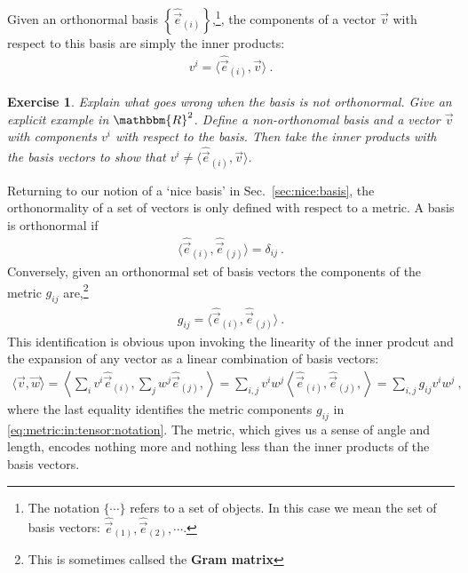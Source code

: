\documentclass[
  11pt,
	colorful,
	raggedright,
]{tufte-style-thesis-flip}
\newtheorem{exercise}{Exercise}[section]
\begin{document}
Given an orthonormal basis $\left\{\hat{\vec{e}}_{(i)}\right\}$,\footnote{The notation $\{\cdots\}$ refers to a set of objects. In this case we mean the set of basis vectors: $\hat{\vec{e}}_{(1)}, \hat{\vec{e}}_{(2)}, \cdots$. }, the components of a vector $\vec v$ with respect to this basis are simply the inner products:
\begin{align}
  v^i = \langle \hat{\vec{e}}_{(i)}, \vec v \rangle \ .
\end{align}
\begin{exercise}
Explain what goes wrong when the basis is not orthonormal. Give an explicit example in $\mathbbm{R}^2$. Define a non-orthonomal basis and a vector $\vec v$ with components $v^i$ with respect to the basis. Then take the inner products with the basis vectors to show that $v^i \neq \langle \hat{\vec{e}}_{(i)}, \vec v \rangle$.
\end{exercise}

Returning to our notion of a `nice basis' in Sec.~\ref{sec:nice:basis}, the orthonormality of a set of vectors is only defined with respect to a metric. A basis is orthonormal if
\begin{align}
  \langle \hat{\vec{e}}_{(i)}, \hat{\vec{e}}_{(j)} \rangle
  = \delta_{ij} 
  \ .
\end{align}
Conversely, given an orthonormal set of basis vectors the components of the metric $g_{ij}$ are,\footnote{This is sometimes callsed the \textbf{Gram matrix}} 
\begin{align}
  g_{ij} = \langle \hat{\vec{e}}_{(i)}, \hat{\vec{e}}_{(j)} \rangle \ .
\end{align}
This identification is obvious upon invoking the linearity of the inner prodcut and the expansion of any vector as a linear combination of basis vectors:
\begin{align}
  \langle \vec v, \vec w \rangle = 
  \left\langle
    \sum_i v^i \hat{\vec{e}}_{(i)},
    \sum_j w^j \hat{\vec{e}}_{(j)},
  \right\rangle
  =
  \sum_{i,j}
  v^iw^j\left\langle
     \hat{\vec{e}}_{(i)},
    \hat{\vec{e}}_{(j)},
  \right\rangle
  = 
  \sum_{i,j}
  g_{ij}v^iw^j
   \ ,
\end{align}
where the last equality identifies the metric components $g_{ij}$ in \eqref{eq:metric:in:tensor:notation}. The metric, which gives us a sense of angle and length, encodes nothing more and nothing less than the inner products of the basis vectors.
\end{document}
